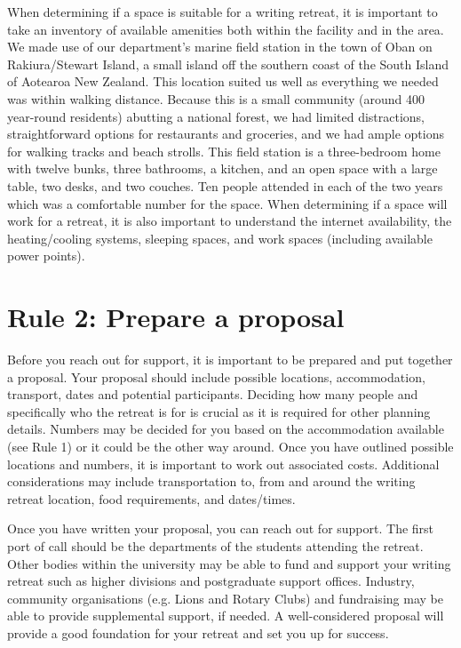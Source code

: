 \documentclass[10pt,letterpaper]{article}
\begin{document}
When determining if a space is suitable for a writing retreat, it is important to take an inventory of available amenities both within the facility and in the area. We made use of our department’s marine field station in the town of Oban on Rakiura/Stewart Island, a small island off the southern coast of the South Island of Aotearoa New Zealand. This location suited us well as everything we needed was within walking distance. Because this is a small community (around 400 year-round residents) abutting a national forest, we had limited distractions, straightforward options for restaurants and groceries, and we had ample options for walking tracks and beach strolls. This field station is a three-bedroom home with twelve bunks, three bathrooms, a kitchen, and an open space with a large table, two desks, and two couches. Ten people attended in each of the two years which was a comfortable number for the space. When determining if a space will work for a retreat, it is also important to understand the internet availability, the heating/cooling systems, sleeping spaces, and work spaces (including available power points).

\section*{Rule 2: Prepare a proposal}

Before you reach out for support, it is important to be prepared and put together a proposal. Your proposal should include possible locations, accommodation, transport, dates and potential participants. Deciding how many people and specifically who the retreat is for is crucial as it is required for other planning details. Numbers may be decided for you based on the accommodation available (see Rule 1) or it could be the other way around. Once you have outlined possible locations and numbers, it is important to work out associated costs. Additional considerations may include transportation to, from and around the writing retreat location, food requirements, and dates/times.

Once you have written your proposal, you can reach out for support. The first port of call should be the departments of the students attending the retreat. Other bodies within the university may be able to fund and support your writing retreat such as higher divisions and postgraduate support offices. Industry, community organisations (e.g. Lions and Rotary Clubs) and fundraising may be able to provide supplemental support, if needed. A well-considered proposal will provide a good foundation for your retreat and set you up for success.
\end{document}
